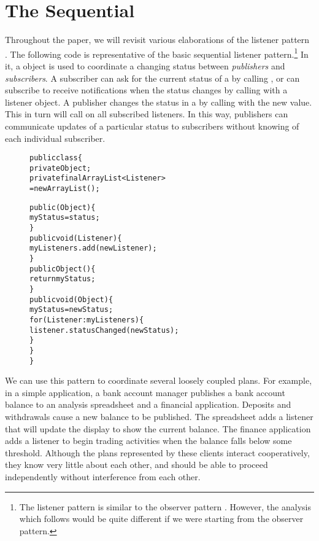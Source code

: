 \documentclass{llncs}
\begin{document}

\section{The Sequential }

Throughout the paper, we will revisit various elaborations of the
listener pattern \cite{Englander:beans}. The following code is
representative of the basic sequential listener pattern.\footnote{
%
The listener pattern \cite{Englander:beans} is similar to the observer
pattern \cite{gamma:patterns}. However, the analysis which follows
would be quite different if we were starting from the observer
pattern.}
%
In it, a  object is used to coordinate a changing
status between \emph{publishers} and \emph{subscribers}.  A subscriber
can ask for the current status of a  by calling
, or can subscribe to receive notifications when the
status changes by calling  with a listener object.
A publisher changes the status in a  by calling
 with the new value.  This in turn will call
 on all subscribed listeners.  In this way,
publishers can communicate updates of a particular status to
subscribers without knowing of each individual subscriber.
%
\begin{figure}
\begin{alltt}
    public class  \{
        private Object ;
        private final ArrayList<Listener>  
                          = new ArrayList();

        public (Object ) \{
            myStatus = status;
        \}
        public void (Listener ) \{
            myListeners.add(newListener);
        \}
        public Object () \{
            return myStatus; 
        \}
        public void (Object ) \{
            myStatus = newStatus;
            for (Listener : myListeners) \{
                listener.statusChanged(newStatus);
            \}
        \}
    \}
\end{alltt}
\end{figure}
%
We can use this pattern to coordinate several loosely coupled
plans. For example, in a simple application, a bank account
manager publishes a bank account balance to an analysis spreadsheet
and a financial application.  Deposits and withdrawals cause a new
balance to be published.  The spreadsheet adds a listener that will
update the display to show the current balance. The finance
application adds a listener to begin trading activities when the
balance falls below some threshold.  Although the plans represented by
these clients interact cooperatively, they know very little about each
other, and should be able to proceed independently without
interference from each other.  
\end{document}
